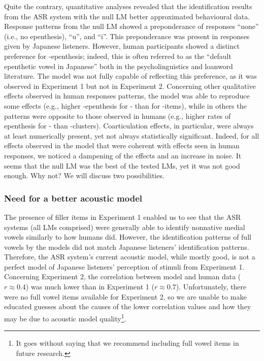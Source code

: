 {%
Quite the contrary, quantitative analyses revealed that the identification results from the ASR system with the null LM better approximated behavioural data. 
Response patterns from the null LM showed a preponderance of responses ``none'' (i.e., no epenthesis), ``u'', and ``i''. This preponderance was present in responses given by Japanese listeners.
However, human participants showed a distinct preference for -epenthesis; indeed, this is often referred to as the ``default epenthetic vowel in Japanese'' both in the psycholinguistics and loanword literature. The model was not fully capable of reflecting this preference, as it was observed in Experiment 1 but not in Experiment 2.  
Concerning other qualitative effects observed in human responses patterns, the model was able to reproduce some effects (e.g., higher -epenthesis for - than for -items), while in others the patterns were opposite to those observed in humans (e.g., higher rates of epenthesis for - than -clusters). Coarticulation effects, in particular, were always at least numerically present, yet not always statistically significant. Indeed, for all effects observed in the model that were coherent with effects seen in human responses, we noticed a dampening of the effects and an increase in noise. It seems that the null LM was the best of the tested LMs, yet it was not good enough. Why not? We will discuss two possibilities. 

\subsubsection{Need for a better acoustic model}
The presence of filler items in Experiment 1 enabled us to see that the ASR systems (all LMs comprised) were generally able to identify nonnative medial vowels  similarly to how humans did. However, the identification patterns of full vowels  by the models did not match Japanese listeners' identification patterns. Therefore, the ASR system's current acoustic model, while mostly good, is not a perfect model of Japanese listeners' perception of stimuli from Experiment 1.
Concerning Experiment 2, the correlation between model and human data ($r \approx 0.4$) was much lower than in Experiment 1 ($r \approx 0.7$). Unfortunately, there were no full vowel items available for Experiment 2, so we are unable to make educated guesses about the causes of the lower correlation values and how they may be due to acoustic model quality\footnote{It goes without saying that we recommend including full vowel items in future research.}.

}
